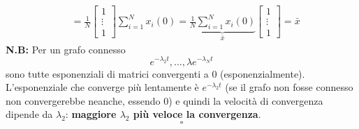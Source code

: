 \begin{tcolorbox}
\begin{align*}
&= \frac{1}{N} \begin{bmatrix} 1 \\ \vdots \\ 1 \end{bmatrix} \sum_{i=1}^N x_i(0) = \underbrace{\frac{1}{N}\sum_{i=1}^N x_i(0)}_{\bar{x}} \begin{bmatrix} 1 \\ \vdots \\ 1 \end{bmatrix} = \bar{x}
\end{align*}
\textbf{N.B:} Per un grafo connesso 
\begin{equation}
e^{-\lambda_2 t}, \dots, \lambda e^{-\lambda_N t}
\end{equation} sono tutte esponenziali di matrici convergenti a 0 (esponenzialmente). L'esponenziale che converge pi\`u lentamente \`e $e^{-\lambda_2 t}$ (se il grafo non fosse connesso non convergerebbe neanche, essendo 0) e quindi la velocit\`a di convergenza dipende da $\lambda_2$: \textbf{maggiore $\lambda_2$ pi\`u veloce la convergenza}.
\[
\square
\]
\end{tcolorbox}

